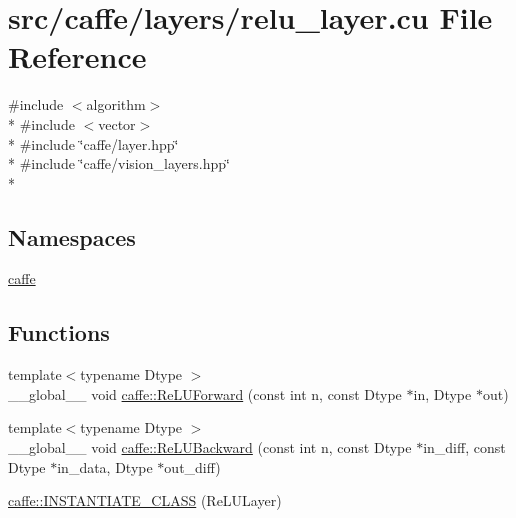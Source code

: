 \hypertarget{relu__layer_8cu}{\section{src/caffe/layers/relu\+\_\+layer.cu File Reference}
\label{relu__layer_8cu}
}
{\ttfamily \#include $<$algorithm$>$}\\*
{\ttfamily \#include $<$vector$>$}\\*
{\ttfamily \#include \char`\"{}caffe/layer.\+hpp\char`\"{}}\\*
{\ttfamily \#include \char`\"{}caffe/vision\+\_\+layers.\+hpp\char`\"{}}\\*
\subsection*{Namespaces}
\begin{DoxyCompactItemize}
\item 
 \hyperlink{namespacecaffe}{caffe}
\end{DoxyCompactItemize}
\subsection*{Functions}
\begin{DoxyCompactItemize}
\item 
{\footnotesize template$<$typename Dtype $>$ }\\\+\_\+\+\_\+global\+\_\+\+\_\+ void \hyperlink{namespacecaffe_ac5ca8087a73d4ccc045d858440c8c61d}{caffe\+::\+Re\+L\+U\+Forward} (const int n, const Dtype $\ast$in, Dtype $\ast$out)
\item 
{\footnotesize template$<$typename Dtype $>$ }\\\+\_\+\+\_\+global\+\_\+\+\_\+ void \hyperlink{namespacecaffe_af33d9be2073b5cbc8b5a301d225bd837}{caffe\+::\+Re\+L\+U\+Backward} (const int n, const Dtype $\ast$in\+\_\+diff, const Dtype $\ast$in\+\_\+data, Dtype $\ast$out\+\_\+diff)
\item 
\hyperlink{namespacecaffe_a889d40ff9d35d8cdcf75089259d4ada0}{caffe\+::\+I\+N\+S\+T\+A\+N\+T\+I\+A\+T\+E\+\_\+\+C\+L\+A\+S\+S} (Re\+L\+U\+Layer)
\end{DoxyCompactItemize}
